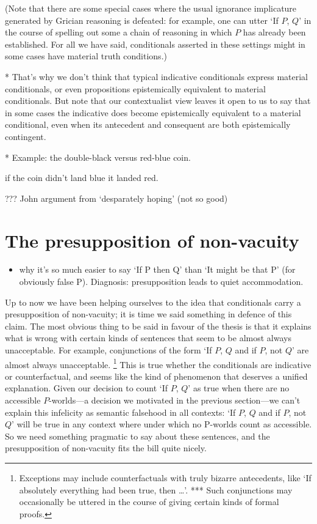 \documentclass[If.tex]{subfiles}
\begin{document}
\begin{prop}
(Note that there are some special cases where the usual ignorance implicature generated by Grician reasoning is defeated: for example, one can utter ‘If $P$, $Q$’ in the course of spelling out some a chain of reasoning in which $P$ has already been established.  For all we have said, conditionals asserted in these settings might in some cases have material truth conditions.)



* That's why we don't think that typical indicative conditionals express material conditionals, or even propositions epistemically equivalent to material conditionals.  But note that our contextualist view leaves it open to us to say that in some cases the indicative does become epistemically equivalent to a material conditional, even when its antecedent and consequent are both epistemically contingent.  

* Example: the double-black versus red-blue coin.  
\begin{prop}
	 if the coin didn't land blue it landed red.
\end{prop}
??? John argument from ‘desparately hoping’ (not so good)


\section{The presupposition of non-vacuity}
\label{sect:nonvacuity}
\begin{itemize} 
	\item
	why it's so much easier to say ‘If P then Q’ than ‘It might be that P’ (for obviously false P). Diagnosis: presupposition leads to quiet accommodation.
\end{itemize}

Up to now we have been helping ourselves to the idea that conditionals carry a presupposition of non-vacuity; it is time we said something in defence of this claim. The most obvious thing to be said in favour of the thesis is that it explains what is wrong with certain kinds of sentences that seem to be almost always unacceptable. For example, conjunctions of the form ‘If $P$, $Q$ and if $P$, not $Q$’ are almost always unacceptable.%
\footnote{Exceptions may include counterfactuals with truly bizarre antecedents, like ‘If absolutely everything had been true, then …’.   *** Such conjunctions may occasionally be uttered in the course of giving certain kinds of formal proofs.  } 
This is true whether the conditionals are indicative or counterfactual, and seems like the kind of phenomenon that deserves a unified explanation. Given our decision to count ‘If $P$, $Q$’ as true when there are no accessible $P$-worlds---a decision we motivated in the previous section---we can't explain this infelicity as semantic falsehood in all contexts: ‘If $P$, $Q$ and if $P$, not $Q$’ will be true in any context where under which no P-worlds count as accessible. So we need something pragmatic to say about these sentences, and the presupposition of non-vacuity fits the bill quite nicely.


\end{prop}
\end{document}
